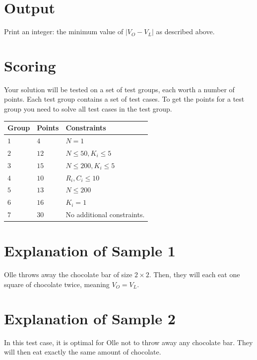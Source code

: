 \section*{Output}
Print an integer: the minimum value of $|V_O - V_L|$ as described above.  

\section*{Scoring}
Your solution will be tested on a set of test groups, each worth a number of points. Each test group contains
a set of test cases. To get the points for a test group you need to solve all test cases in the test group.

\noindent
\begin{tabular}{| l | l | p{12cm} |}
  \hline
  \textbf{Group} & \textbf{Points} & \textbf{Constraints} \\ \hline
  $1$    & $4$        & $N = 1$ \\ \hline
  $2$    & $12$       & $N \leq 50, K_i \leq 5$ \\ \hline
  $3$    & $15$       & $N \leq 200, K_i \leq 5$ \\ \hline
  $4$    & $10$       & $R_i, C_i \leq 10$ \\ \hline
  $5$    & $13$       & $N \leq 200$ \\ \hline
  $6$    & $16$       & $K_i = 1$ \\ \hline
  $7$    & $30$       & No additional constraints. \\ \hline
\end{tabular}

\section*{Explanation of Sample 1}
Olle throws away the chocolate bar of size $2 \times 2$.  
Then, they will each eat one square of chocolate twice, meaning $V_O = V_L$.  

\section*{Explanation of Sample 2}
In this test case, it is optimal for Olle not to throw away any chocolate bar.  
They will then eat exactly the same amount of chocolate.  
